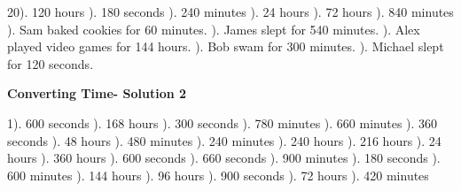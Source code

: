 \documentclass{article}%
\begin{document}
20). 120 hours%
). 180 seconds%
). 240 minutes%
). 24 hours%
). 72 hours%
). 840 minutes%
). Sam baked cookies for 60 minutes.%
). James slept for 540 minutes.%
). Alex played video games for 144 hours.%
). Bob swam for 300 minutes.%
). Michael slept for 120 seconds.%
\newline%
\newpage%
\large%
\begin{center}%
\textbf{Converting Time- Solution 2}%
\newline%
\end{center} \normalsize%
1). 600 seconds%
). 168 hours%
). 300 seconds%
). 780 minutes%
). 660 minutes%
). 360 seconds%
). 48 hours%
). 480 minutes%
). 240 minutes%
). 240 hours%
). 216 hours%
). 24 hours%
). 360 hours%
). 600 seconds%
). 660 seconds%
). 900 minutes%
). 180 seconds%
). 600 minutes%
). 144 hours%
). 96 hours%
). 900 seconds%
). 72 hours%
). 420 minutes%
\newline%
\end{document}
